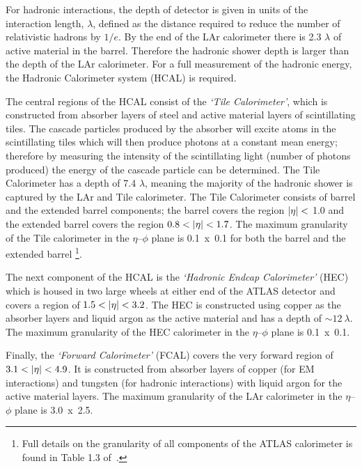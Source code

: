 For hadronic interactions, the depth of detector is given in units of the interaction length, $\lambda$,
defined as the distance required to reduce the number of relativistic hadrons by $1/e$.
By the end of the LAr calorimeter there is 2.3 $\lambda$ of active material in the barrel.
Therefore the hadronic shower depth is larger than the depth of the LAr calorimeter.
For a full measurement of the hadronic energy, the Hadronic Calorimeter system (HCAL) is required. 

The central regions of the HCAL consist of the \textit{`Tile Calorimeter'},
which is constructed from absorber layers of steel and active material layers of scintillating tiles.
The cascade particles produced by the absorber will excite atoms in the scintillating tiles which will then produce photons at a constant mean energy;
therefore by measuring the intensity of the scintillating light (number of photons produced) the energy of the cascade particle can be determined.
The Tile Calorimeter has a depth of 7.4 $\lambda$, meaning the majority of the hadronic shower is captured by the LAr and Tile calorimeter.
The Tile Calorimeter consists of barrel and the extended barrel components;
the barrel covers the region $|\eta|\nobreak<$ 1.0 and the extended barrel covers the region $0.8\nobreak<\nobreak|\eta|\nobreak<\nobreak1.7$.
The maximum granularity of the Tile calorimeter in the $\eta$--$\phi$ plane
is 0.1~x~0.1 for both the barrel and the extended barrel \footnote{Full details on the granularity of all components of the ATLAS calorimeter is found in Table 1.3 of~\cite{det-ATLAS_Exp}.}. 

The next component of the HCAL is the \textit{`Hadronic Endcap Calorimeter'} (HEC)
which is housed in two large wheels at either end of the ATLAS detector
and covers a region of $1.5\nobreak<\nobreak|\eta|\nobreak<\nobreak3.2$.
The HEC is constructed using copper as the absorber layers and liquid argon as the active material
and has a depth of $\sim 12~\lambda$.
The maximum granularity of the HEC calorimeter in the $\eta$--$\phi$ plane is \mbox{0.1~x~0.1.}

Finally, the \textit{`Forward Calorimeter'} (FCAL) covers the very forward region of $3.1\nobreak<\nobreak|\eta|\nobreak<\nobreak4.9$.
It is constructed from absorber layers of
copper (for EM interactions) and tungsten (for hadronic interactions)
with liquid argon for the active material layers.
The maximum granularity of the LAr calorimeter in the $\eta$--$\phi$ plane is 3.0~x~2.5.

